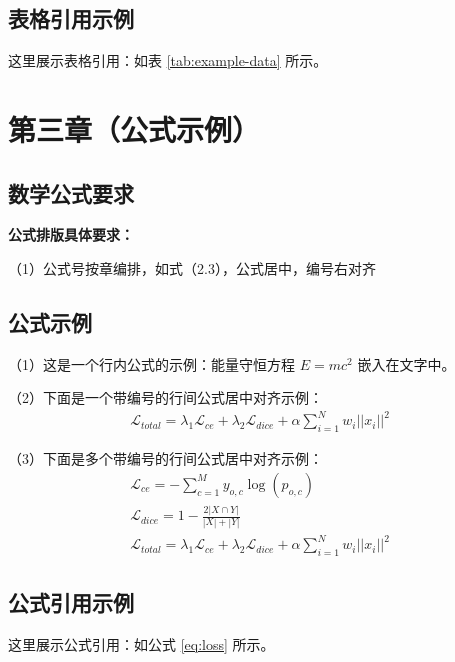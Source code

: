 \documentclass[]{WTUthesis}
\begin{document}
\section{表格引用示例}
这里展示表格引用：如表 \ref{tab:example-data} 所示。

\chapter{第三章（公式示例）}

\section{数学公式要求}
\textbf{公式排版具体要求：}

（1）公式号按章编排，如式（2.3），公式居中，编号右对齐

\section{公式示例}
（1）这是一个行内公式的示例：能量守恒方程 $E = mc^2$ 嵌入在文字中。

（2）下面是一个带编号的行间公式居中对齐示例：
\begin{align}
    \mathcal{L}_{total} = \lambda_1 \mathcal{L}_{ce} + \lambda_2 \mathcal{L}_{dice} + \alpha \sum_{i=1}^{N} w_i ||x_i||^2
    \label{eq:loss}
\end{align}

（3）下面是多个带编号的行间公式居中对齐示例：
\begin{gather}
    \mathcal{L}_{ce} = - \sum_{c=1}^M y_{o,c} \log(p_{o,c}) \\
    \mathcal{L}_{dice} = 1 - \frac{2 |X \cap Y|}{|X| + |Y|} \\
    \mathcal{L}_{total} = \lambda_1 \mathcal{L}_{ce} + \lambda_2 \mathcal{L}_{dice} + \alpha \sum_{i=1}^{N} w_i ||x_i||^2
    \label{eq:loss_gathered}
\end{gather}

\section{公式引用示例}
这里展示公式引用：如公式 \ref{eq:loss} 所示。


\end{document}
